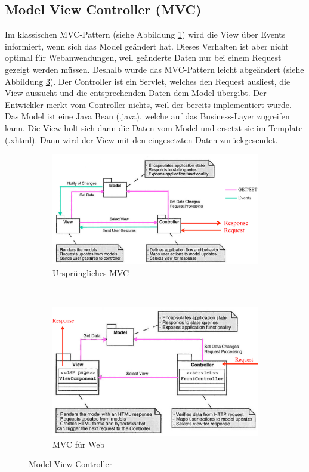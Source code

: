 \subsection{Model View Controller (MVC)}

Im klassischen MVC-Pattern (siehe Abbildung \ref{fig:mvc1}) wird die View über Events informiert, wenn sich das Model geändert hat. Dieses Verhalten ist aber nicht optimal für Webanwendungen, weil geänderte Daten nur bei einem Request gezeigt werden müssen. Deshalb wurde das MVC-Pattern leicht abgeändert (siehe Abbildung \ref{fig:mvc2}). Der Controller ist ein Servlet, welches den Request ausliest, die View aussucht und die entsprechenden Daten dem Model übergibt. Der Entwickler merkt vom Controller nichts, weil der bereits implementiert wurde. Das Model ist eine Java Bean (.java), welche auf das Business-Layer zugreifen kann. Die View holt sich dann die Daten vom Model und ersetzt sie im Template (.xhtml). Dann wird der View mit den eingesetzten Daten zurückgesendet.

\begin{figure}
	\centering
	\begin{subfigure}[b]{0.5\textwidth}
		\includegraphics[width=\textwidth]{fig/mvc1}
		\caption{Ursprüngliches MVC}
		\label{fig:mvc1}
	\end{subfigure}
	~
	\begin{subfigure}[b]{0.4\textwidth}
		\includegraphics[width=\textwidth]{fig/mvc2}
		\caption{MVC für Web}
		\label{fig:mvc2}
	\end{subfigure}
	\caption{Model View Controller}
\end{figure}

